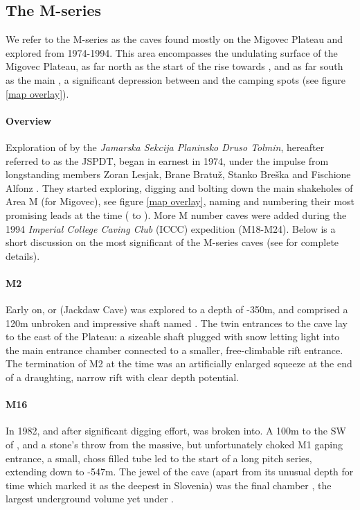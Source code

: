 \subsection{The M-series} 
We refer to the M-series as the caves found mostly on the Migovec Plateau and explored from 1974-1994. This area encompasses the undulating surface of the Migovec Plateau, as far north as the start of the rise towards \protect{}, and as far south as the main \protect{}, a significant depression between \protect{} and the camping spots (see figure \ref{map overlay}).


\paragraph{Overview} Exploration of  by the \textit{Jamarska Sekcija Planinsko Druso Tolmin}, hereafter referred to as the JSPDT, began in earnest in 1974, under the impulse from longstanding members Zoran Lesjak, Brane Bratuž, Stanko Breška and Fischione Alfonz \citep{hm1}. They started exploring, digging and bolting down the main shakeholes of Area M (for Migovec), see figure \ref{map overlay}, naming and numbering their most promising leads at the time ( to ). More M number caves were added during the 1994 \textit{Imperial College Caving Club} (ICCC) expedition (M18-M24). Below is a short discussion on the most significant of the M-series caves (see \citet{hm1} for complete details). 


\paragraph{M2} Early on,  or  (Jackdaw Cave) was explored to a depth of -350m, and comprised a 120m unbroken and impressive shaft named . The twin entrances to the cave lay to the east of the Plateau: a sizeable shaft plugged with snow letting light into the main entrance chamber connected to a smaller, free-climbable rift entrance. The termination of M2 at the time was an artificially enlarged squeeze at the end of a draughting, narrow rift with clear depth potential.

\paragraph{M16} In 1982, and after significant digging effort,  was broken into. A 100m to the SW of , and a stone's throw from the massive, but unfortunately choked M1 gaping entrance, a small, choss filled tube led to the start of a long pitch series, extending down to -547m. The jewel of the cave (apart from its unusual depth for time which marked it as the deepest in Slovenia) was the final chamber , the largest underground volume yet under . 

